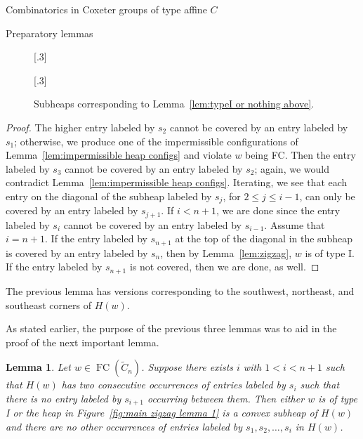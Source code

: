 \documentclass[11pt]{amsart}
\newtheorem{lemma}[theorem]{Lemma}
\theoremstyle{definition}
\numberwithin{equation}{section}
\newcommand{\C}{\widetilde{C}}
\renewcommand{\(}{\left(}
\renewcommand{\)}{\right)}
\DeclareMathOperator{\FC}{FC}
\newcommand\xxaxis{0}
\newcommand\yyaxis{90}
\newcommand\heapblock[3]{\fill[draw=black, fill=gray!30, rounded corners, line width=1.1pt, shift={(\xxaxis:#1)},shift={(\yyaxis:#2)}] (-1,-0.5) rectangle (1,0.5);\node at (#1,#2) {$#3$};}
\newcommand\heapblank[2]{\fill[fill=white, dotted, draw=black, line width=1.1pt, rounded corners, shift={(\xxaxis:#1)},shift={(\yyaxis:#2)}] (-1,-0.5) rectangle (1,0.5);}
\begin{document}
\begin{section}{Combinatorics in Coxeter groups of type affine $C$}
\begin{subsection}{Preparatory lemmas}
\begin{figure}[!ht]
\subcaptionbox{\label{fig:typeI or nothing above 1}}[.3\textwidth]{
}
\subcaptionbox{\label{fig:typeI or nothing above 2}}[.3\textwidth]{
}
\caption{Subheaps corresponding to Lemma~\ref{lem:typeI or nothing above}.}
\end{figure}

\begin{proof}
The higher entry labeled by $s_{2}$ cannot be covered by an entry labeled by $s_{1}$; otherwise, we produce one of the impermissible configurations of Lemma~\ref{lem:impermissible heap configs} and violate $w$ being FC.  Then the entry labeled by $s_{3}$ cannot be covered by an entry labeled by $s_{2}$; again, we would contradict Lemma~\ref{lem:impermissible heap configs}.  Iterating, we see that each entry on the diagonal of the subheap labeled by $s_{j}$, for $2 \leq j \leq i-1$, can only be covered by an entry labeled by $s_{j+1}$.  If $i<n+1$, we are done since the entry labeled by $s_{i}$ cannot be covered by an entry labeled by $s_{i-1}$.  Assume that $i=n+1$.  If the entry labeled by $s_{n+1}$ at the top of the diagonal in the subheap is covered by an entry labeled by $s_{n}$, then by Lemma~\ref{lem:zigzag}, $w$ is of type I.  If the entry labeled by $s_{n+1}$ is not covered, then we are done, as well.
\end{proof}

The previous lemma has versions corresponding to the southwest, northeast, and southeast corners of $H(w)$.  

As stated earlier, the purpose of the previous three lemmas was to aid in the proof of the next important lemma.  

\begin{lemma}\label{lem:main zigzag lemma}
Let $w \in \FC(\C_{n})$.  Suppose there exists $i$ with $1<i < n+1$ such that $H(w)$ has two consecutive occurrences of entries labeled by $s_{i}$ such that there is no entry labeled by $s_{i+1}$ occurring between them.  Then either $w$ is of type I or the heap in Figure~\ref{fig:main zigzag lemma 1} is a convex subheap of $H(w)$ and there are no other occurrences of entries labeled by $s_{1}, s_{2}, \dots, s_{i}$ in $H(w)$.
\end{lemma}


\end{subsection}
\end{section}
\end{document}
